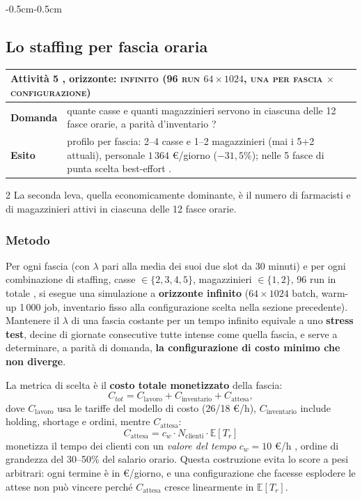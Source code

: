 \documentclass{article}
\newcommand{\schedaattivita}[4]{%
\noindent
{\renewcommand{\arraystretch}{1.25}%
\begin{tabularx}{\linewidth}{|p{2.2cm}|X|}
\hline
\multicolumn{2}{|l|}{\textbf{Attività #1} \;,  \; orizzonte: \textbf{\textsc{#2}}} \\
\hline
\textbf{Domanda} & #3 \\
\hline
\textbf{Esito} & #4 \\
\hline
\end{tabularx}}\par\vspace{6pt}}
\begin{document}
\begin{adjustwidth}{-0.5cm}{-0.5cm}
\subsection{Lo staffing per fascia oraria}
\schedaattivita{5}{infinito (96 run $64 \times 1024$, una per fascia $\times$ configurazione)}%
{quante casse e quanti magazzinieri servono in ciascuna delle 12 fasce orarie, a parità
d'inventario ?}%
{profilo per fascia: 2--4 casse e 1--2 magazzinieri (mai i 5+2 attuali), personale
$1\,364$ \euro/giorno ($-31{,}5\%$); nelle 5 fasce di punta scelta best-effort .}
\begin{multicols}{2}
La seconda leva,  quella economicamente dominante,  è il numero di farmacisti  e di
magazzinieri attivi in ciascuna delle 12 fasce orarie.

\subsubsection*{Metodo}
Per ogni fascia (con $\lambda$ pari alla media dei suoi due slot da 30 minuti) e per ogni
combinazione di staffing,  casse $\in \{2,3,4,5\}$, magazzinieri $\in \{1,2\}$, 96 run in totale
,  si esegue una simulazione a \textbf{orizzonte infinito} ($64 \times 1024$ batch, warm-up
1\,000 job, inventario fisso alla configurazione scelta nella sezione precedente). Mantenere il $\lambda$ di una fascia costante per un tempo infinito
equivale a uno \textbf{stress test},  decine di giornate consecutive tutte intense come quella
fascia,  e serve a determinare, a parità di domanda, \textbf{la configurazione di costo minimo
che non diverge}.

La metrica di scelta è il \textbf{costo totale monetizzato} della fascia:
\[
C_{tot} = C_{\text{lavoro}} + C_{\text{inventario}} + C_{\text{attesa}},
\]
dove $C_{\text{lavoro}}$ usa le tariffe del modello di costo (26/18 \euro/h),
$C_{\text{inventario}}$ include holding, shortage e ordini, mentre $C_{\text{attesa}}$:
\[C_{\text{attesa}}= c_w \cdot
N_{\text{clienti}} \cdot \mathbb{E}[T_r]\] monetizza il tempo dei clienti con un \emph{valore del
tempo} $c_w = 10$ \euro/h , ordine di grandezza del 30--50\% del salario orario. Questa costruzione evita lo score a pesi arbitrari: ogni termine è in
\euro/giorno, e una configurazione che facesse esplodere le attese non può vincere
perché $C_{\text{attesa}}$ cresce linearmente in $\mathbb{E}[T_r]$.


\end{multicols}
\end{adjustwidth}
\end{document}
